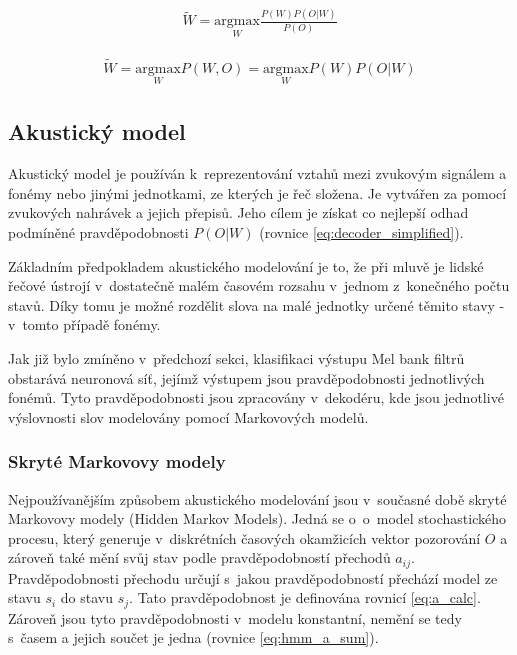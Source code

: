 \begin{equation} \label{eq:decoder_bayes}
\begin{gathered}
\tilde{W} = \underset{W}{\mathrm{arg max }} \frac{P(W)P(O|W)}{P(O)}
\end{gathered}
\end{equation}

\begin{equation} \label{eq:decoder_simplified}
\begin{gathered}
\tilde{W} = \underset{W}{\mathrm{arg max }} P(W,O) = \underset{W}{\mathrm{arg max }} P(W)P(O|W)
\end{gathered}
\end{equation}

\subsection{Akustický model}\label{sec:acoustic_model}
Akustický model je používán k~reprezentování vztahů mezi zvukovým signálem a fonémy nebo jinými jednotkami, ze kterých je řeč složena. Je vytvářen za pomocí zvukových nahrávek a jejich přepisů. Jeho cílem je získat co nejlepší odhad podmíněné pravděpodobnosti $P(O|W)$ (rovnice \ref{eq:decoder_simplified}). 

Základním předpokladem akustického modelování je to, že při mluvě je lidské řečové ústrojí v~dostatečně malém časovém rozsahu v~jednom z~konečného počtu stavů. Díky tomu je možné rozdělit slova na malé jednotky určené těmito stavy - v~tomto případě fonémy.

Jak již bylo zmíněno v~předchozí sekci, klasifikaci výstupu Mel bank filtrů obstarává neuronová síť, jejímž výstupem jsou pravděpodobnosti jednotlivých fonémů. Tyto pravděpodobnosti jsou zpracovány v~dekodéru, kde jsou jednotlivé výslovnosti slov modelovány pomocí Markovových modelů.

\subsubsection{Skryté Markovovy modely}
Nejpoužívanějším způsobem akustického modelování jsou v~současné době skryté Markovovy modely (Hidden Markov Models). Jedná se o~o~model stochastického procesu, který generuje v~diskrétních časových okamžicích vektor pozorování $O$ a zároveň také mění svůj stav podle pravděpodobností přechodů $a_{ij}$. Pravděpodobnosti přechodu určují s~jakou pravděpodobností přechází model ze stavu $s_i$ do stavu $s_j$. Tato pravděpodobnost je definována rovnicí \ref{eq:a_calc}. Zároveň jsou tyto pravděpodobnosti v~modelu konstantní, nemění se tedy s~časem a jejich součet je jedna (rovnice \ref{eq:hmm_a_sum}).

